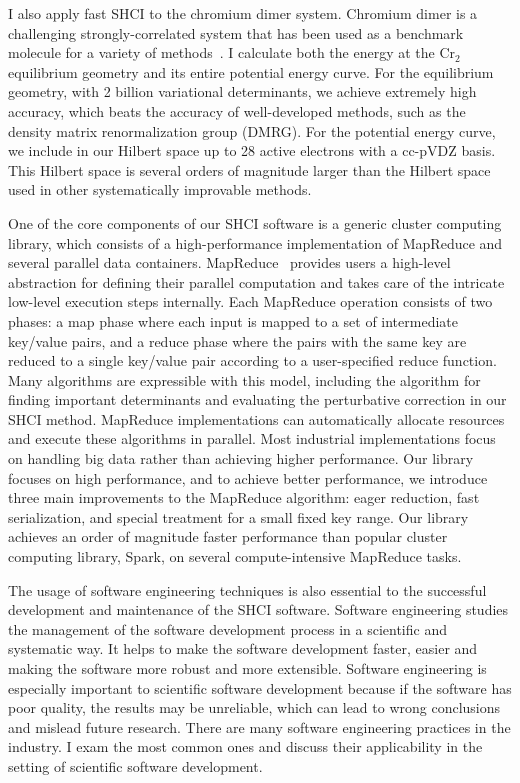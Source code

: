 \documentclass[phd,tocprelim]{cornell}
\begin{document}
I also apply fast SHCI to the chromium dimer system.
Chromium dimer is a challenging strongly-correlated system that has been used as a benchmark molecule for a variety of methods~\cite{Scu-JCP-91,KurYan-JCP-11,PurZhaKra-JCP-15,MaManOlsGag-JCTC-16,VanMalVer-JCTC-16,GuoWatHuSunCha-JCTC-16}.
I calculate both the energy at the Cr$_2$ equilibrium geometry and its entire potential energy curve.
For the equilibrium geometry, with 2 billion variational determinants, we achieve extremely high accuracy, which beats the accuracy of well-developed methods, such as the density matrix renormalization group (DMRG).
For the potential energy curve, we include in our Hilbert space up to 28 active electrons with a cc-pVDZ basis.
This Hilbert space is several orders of magnitude larger than the Hilbert space used in other systematically improvable methods.

One of the core components of our SHCI software is a generic cluster computing library, which consists of a high-performance implementation of MapReduce and several parallel data containers.
MapReduce~\cite{dean2008mapreduce,dean2010mapreduce} provides users a high-level abstraction for defining their parallel computation and takes care of the intricate low-level execution steps internally.
Each MapReduce operation consists of two phases: a map phase where each input is mapped to a set of intermediate key/value pairs, and a reduce phase where the pairs with the same key are reduced to a single key/value pair according to a user-specified reduce function.
Many algorithms are expressible with this model, including the algorithm for finding important determinants and evaluating the perturbative correction in our SHCI method.
MapReduce implementations can automatically allocate resources and execute these algorithms in parallel.
Most industrial implementations focus on handling big data rather than achieving higher performance.
Our library focuses on high performance, and to achieve better performance, we introduce three main improvements to the MapReduce algorithm: eager reduction, fast serialization, and special treatment for a small fixed key range.
Our library achieves an order of magnitude faster performance than popular cluster computing library, Spark, on several compute-intensive MapReduce tasks.

The usage of software engineering techniques is also essential to the successful development and maintenance of the SHCI software.
Software engineering studies the management of the software development process in a scientific and systematic way.
It helps to make the software development faster, easier and making the software more robust and more extensible.
Software engineering is especially important to scientific software development because if the software has poor quality, the results may be unreliable, which can lead to wrong conclusions and mislead future research.
There are many software engineering practices in the industry.
I exam the most common ones and discuss their applicability in the setting of scientific software development.
\end{document}

